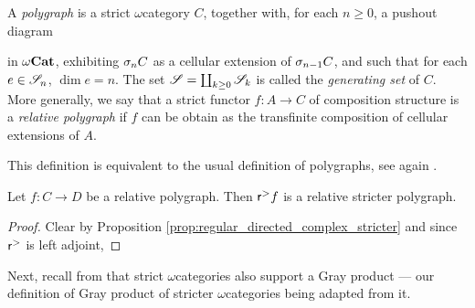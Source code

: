 \begin{dfn} [Polygraph]
    A \emph{polygraph} is a strict \( \omega \)\nbd category \( C \), together with, for each \( n \geq 0 \), a pushout diagram
    \begin{center}
    \end{center}
    in \( {\omega\mathbf{Cat}} \), exhibiting \( \sigma_{n}C \) as a cellular extension of \( \sigma_{n - 1}C \), and such that for each \( e \in \mathscr{S}_n \), \( \dim e = n \).
    The set \( \mathscr{S} = \coprod_{k \geq 0} \mathscr{S}_k \) is called the \emph{generating set} of \( C \).
    More generally, we say that a strict functor \( f \colon A \to C \) of composition structure is a \emph{relative polygraph} if \( f \) can be obtain as the transfinite composition of cellular extensions of \( A \).
\end{dfn}

\begin{rmk}
    This definition is equivalent to the usual definition of polygraphs, see again \cite[Comment 8.2.2]{hadzihasanovic2024combinatorics}.
\end{rmk}

\begin{lem} \label{lem:reflection_of_polygraphs_are_stricter_polygraphs}
    Let \( f \colon C \to D \) be a relative polygraph.
    Then \( \mathsf{r}^{>} f \) is a relative stricter polygraph.
\end{lem}
\begin{proof}
    Clear by Proposition \ref{prop:regular_directed_complex_stricter} and since \( \mathsf{r}^{>} \) is left adjoint, 
\end{proof}

\noindent Next, recall from \cite[Appendice A]{ara2020joint} that strict \( \omega \)\nbd categories also support a Gray product --- our definition of Gray product of stricter \( \omega \)\nbd categories being adapted from it.

